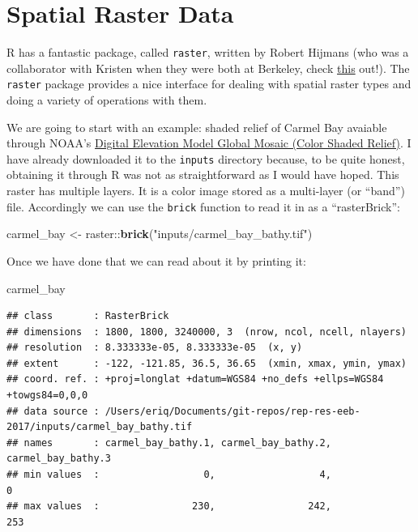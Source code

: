 \documentclass[]{book}
\newenvironment{Shaded}{\begin{snugshade}}{\end{snugshade}}
\newcommand{\KeywordTok}[1]{\textcolor[rgb]{0.13,0.29,0.53}{\textbf{{#1}}}}
\newcommand{\StringTok}[1]{\textcolor[rgb]{0.31,0.60,0.02}{{#1}}}
\newcommand{\NormalTok}[1]{{#1}}
\theoremstyle{definition}
\theoremstyle{definition}
\theoremstyle{remark}
\begin{document}
\section{Spatial Raster Data}\label{spatial-raster-data}

R has a fantastic package, called \texttt{raster}, written by Robert
Hijmans (who was a collaborator with Kristen when they were both at
Berkeley, check
\href{http://onlinelibrary.wiley.com/doi/10.1111/j.1365-2699.2006.01517.x/full}{this}
out!). The \texttt{raster} package provides a nice interface for dealing
with spatial raster types and doing a variety of operations with them.

We are going to start with an example: shaded relief of Carmel Bay
avaiable through NOAA's
\href{http://noaa.maps.arcgis.com/home/item.html?id=feb3c625dc094112bb5281c17679c769}{Digital
Elevation Model Global Mosaic (Color Shaded Relief)}. I have already
downloaded it to the \texttt{inputs} directory because, to be quite
honest, obtaining it through R was not as straightforward as I would
have hoped. This raster has multiple layers. It is a color image stored
as a multi-layer (or ``band'') file. Accordingly we can use the
\texttt{brick} function to read it in as a ``rasterBrick'':

\begin{Shaded}
\begin{Highlighting}[]
\NormalTok{carmel_bay <-}\StringTok{ }\NormalTok{raster::}\KeywordTok{brick}\NormalTok{(}\StringTok{"inputs/carmel_bay_bathy.tif"}\NormalTok{) }
\end{Highlighting}
\end{Shaded}

Once we have done that we can read about it by printing it:

\begin{Shaded}
\begin{Highlighting}[]
\NormalTok{carmel_bay}
\end{Highlighting}
\end{Shaded}

\begin{verbatim}
## class       : RasterBrick 
## dimensions  : 1800, 1800, 3240000, 3  (nrow, ncol, ncell, nlayers)
## resolution  : 8.333333e-05, 8.333333e-05  (x, y)
## extent      : -122, -121.85, 36.5, 36.65  (xmin, xmax, ymin, ymax)
## coord. ref. : +proj=longlat +datum=WGS84 +no_defs +ellps=WGS84 +towgs84=0,0,0 
## data source : /Users/eriq/Documents/git-repos/rep-res-eeb-2017/inputs/carmel_bay_bathy.tif 
## names       : carmel_bay_bathy.1, carmel_bay_bathy.2, carmel_bay_bathy.3 
## min values  :                  0,                  4,                  0 
## max values  :                230,                242,                253
\end{verbatim}
\end{document}
